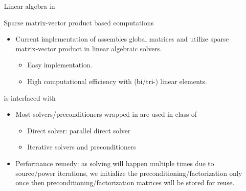 \begin{frame}{Linear algebra in }
	\begin{block}{Sparse matrix-vector product based computations}
		\begin{itemize}
			\item Current implementation of  assembles global matrices and utilize sparse matrix-vector product in linear algebraic solvers.
			\begin{itemize}
				\item Easy implementation.
				\item High computational efficiency with (bi/tri-) linear elements.
			\end{itemize}
		\end{itemize}
	\end{block}
	\begin{block}{ is interfaced with }
		\begin{itemize}
			\item Most  solvers/preconditioners wrapped in  are used in  class of 
			\begin{itemize}
				\item Direct solver: parallel direct solver 
				\item Iterative solvers and preconditioners
			\end{itemize}
			\item Performance remedy: as solving will happen multiple times due to source/power iterations, we initialize the preconditioning/factorization only once then preconditioning/factorization matrices will be stored for reuse.
		\end{itemize}
	\end{block}
\end{frame}
